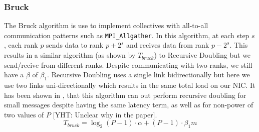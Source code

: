 \documentclass{article}
\newcommand{\yht}[1]{{\color{red}[YHT: #1]}}
\begin{document}
  \subsubsection{Bruck}
  The Bruck algorithm \cite{BruckAlgo}
  is use to implement collectives with all-to-all communication
  patterns such as \texttt{MPI\_Allgather}.
  In this algorithm,
  at each step $s$, each rank $p$ sends data to rank
  $p + 2^s$ and recives data from rank $p - 2^s$.
  This results in a similar algorithm (as shown by $T_{bruck}$)
  to Recursive Doubling but we send/recive from different ranks.
  Despite communicating with two ranks,
  we still have a $\beta$ of $\beta_1$.
  Recursive Doubling uses a single link bidirectionally but here
  we use two links uni-directionally which results in the same total load on
  our NIC.
  It has been shown in \cite{Colls_In_MPICH},
  that this algorithm can out perform recursive doubling for small messages
  despite having the same latency term,
  as well as for non-power of two values of $P$
  \yht{Unclear why in the paper}.
  \begin{equation}
      T_{bruck} = \log_2(P - 1) \cdot \alpha + (P - 1) \cdot \beta_1 m
  \end{equation}
\end{document}
